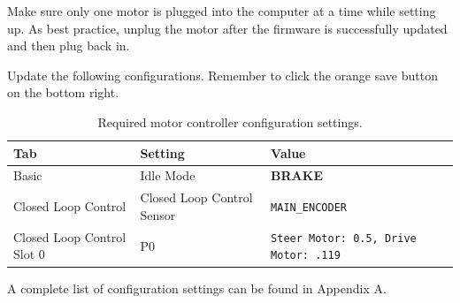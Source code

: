 \begin{warningbox}
Make sure only one motor is plugged into the computer at a time while
setting up. As best practice, unplug the motor after the firmware is
successfully updated and then plug back in.
\end{warningbox}

Update the following configurations. Remember to click
the orange save button on the bottom right.




\begin{table}[H]
\centering
\renewcommand{\arraystretch}{1.35}
\begin{tabularx}{\textwidth}{l X l}
\toprule
\rowcolor{sbotblue!15}
\textbf{Tab} & \textbf{Setting} & \textbf{Value} \\
\midrule
Basic & Idle Mode & \textbf{BRAKE} \\
Closed Loop Control & Closed Loop Control Sensor & \texttt{MAIN\_ENCODER} \\
Closed Loop Control Slot 0 & P0 & \texttt{Steer Motor: 0.5, Drive Motor: .119} \\
\bottomrule
\end{tabularx}
\caption{Required motor controller configuration settings.}
\end{table}

A complete list of configuration settings can be found in Appendix A.






